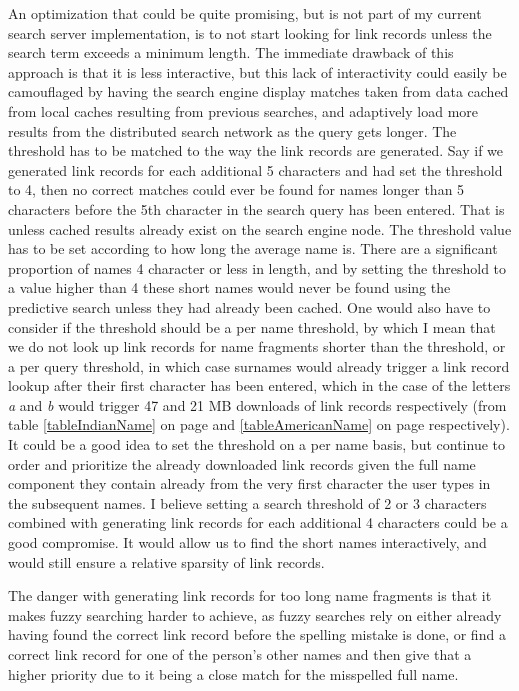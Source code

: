 An optimization that could be quite promising, but is not part of my current search server implementation, is to not start looking for link records unless the search term exceeds a minimum length.
The immediate drawback of this approach is that it is less interactive, but this lack of interactivity could easily be camouflaged by having the search engine display matches taken from data cached from local caches resulting from previous searches, and adaptively load more results from the distributed search network as the query gets longer.
The threshold has to be matched to the way the link records are generated. Say if we generated link records for each additional 5 characters and had set the threshold to 4, then no correct matches could ever be found for names longer than 5 characters before the 5th character in the search query has been entered. That is unless cached results already exist on the search engine node.
The threshold value has to be set according to how long the average name is. There are a significant proportion of names 4 character or less in length, and by setting the threshold to a value higher than 4 these short names would never be found using the predictive search unless they had already been cached.
One would also have to consider if the threshold should be a per name threshold, by which I mean that we do not look up link records for name fragments shorter than the threshold, or a per query threshold, in which case surnames would already trigger a link record lookup after their first character has been entered, which in the case of the letters \emph{a} and \emph{b} would trigger 47 and 21 MB downloads of link records respectively (from table \ref{tableIndianName} on page \pageref{tableIndianName} and \ref{tableAmericanName} on page \pageref{tableAmericanName} respectively). It could be a good idea to set the threshold on a per name basis, but continue to order and prioritize the already downloaded link records given the full name component they contain already from the very first character the user types in the subsequent names.
I believe setting a search threshold of 2 or 3 characters combined with generating link records for each additional 4 characters could be a good compromise. It would allow us to find the short names interactively, and would still ensure a relative sparsity of link records.

The danger with generating link records for too long name fragments is that it makes fuzzy searching harder to achieve, as fuzzy searches rely on either already having found the correct link record before the spelling mistake is done, or find a correct link record for one of the person's other names and then give that a higher priority due to it being a close match for the misspelled full name.

